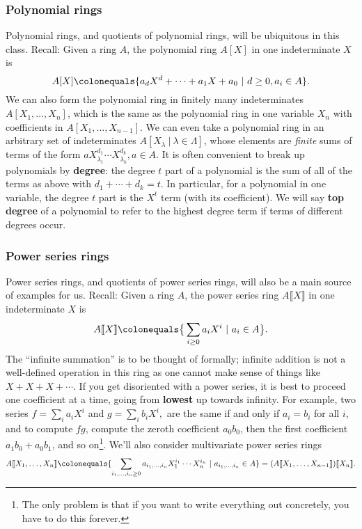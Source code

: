 \documentclass[12pt]{amsart}
\newcommand{\0}{$\phantom{.}$}
\newcommand{\1}{\mathbbm{1}}
\newcommand\ceq{\colonequals}
\begin{document}
\subsubsection*{Polynomial rings} Polynomial rings, and quotients of polynomial rings, will be ubiquitous in this class.
Recall: Given a ring $A$, the polynomial ring $A[X]$ in one indeterminate $X$ is
\[A[X] \ceq \{ a_d X^d + \cdots + a_1 X + a_0 \ | \ d\geq 0, a_i\in A\}.\]
We can also form the polynomial ring in finitely many indeterminates $A[X_1,\dots,X_n]$, which is the same as the polynomial ring in one variable $X_n$ with coefficients in $A[X_1,\dots,X_{n-1}]$. We can even take a polynomial ring in an arbitrary set of indeterminates $A[X_\lambda \ | \ \lambda\in \Lambda]$, whose elements are \emph{finite} sums of terms of the form $a X_{\lambda_1}^{d_1} \cdots X_{\lambda_k}^{d_k}, a\in A$. It is often convenient to break up polynomials by \textbf{degree}: the degree $t$ part of a polynomial is the sum of all of the terms as above with $d_1+\cdots+d_k=t$. In particular, for a polynomial in one variable, the degree $t$ part is the $X^t$ term (with its coefficient). We will say \textbf{top degree} of a polynomial to refer to the highest degree term if terms of different degrees occur.



\subsubsection*{Power series rings} Power series rings, and quotients of power series rings, will also be a main source of examples for us. Recall: Given a ring $A$, the power series ring $A\llbracket X\rrbracket$ in one indeterminate $X$ is
\[A\llbracket X\rrbracket \ceq \big\{ \sum_{i\geq 0} a_i X^i \ | \  a_i\in A\big\}.\]
The ``infinite summation'' is to be thought of formally; infinite addition is not a well-defined operation in this ring as one cannot make sense of things like $X + X + X + \cdots$. If you get disoriented with a power series, it is best to proceed one coefficient at a time, going from \textbf{lowest} up towards infinity. For example, two series $f=\sum_i a_i X^i$ and $g=\sum_i b_i X^i,$ are the same if and only if $a_i=b_i$ for all $i$, and to compute $fg$, compute the zeroth coefficient $a_0 b_0$, then the first coefficient $a_1 b_0 + a_0 b_1$, and so on\footnote{The only problem is that if you want to write everything out concretely, you have to do this forever.}. We'll also consider multivariate power series rings \[A\llbracket X_1,\dots,X_n\rrbracket \ceq \{ \sum_{i_1,\dots,i_n \geq 0} a_{i_1,\dots,i_n} X_1^{i_1} \cdots X_n^{i_n} \ | \ a_{i_1,\dots,i_n}\in A\} = (A\llbracket X_1,\dots,X_{n-1}\rrbracket)\llbracket X_{n}\rrbracket.\]
\end{document}
